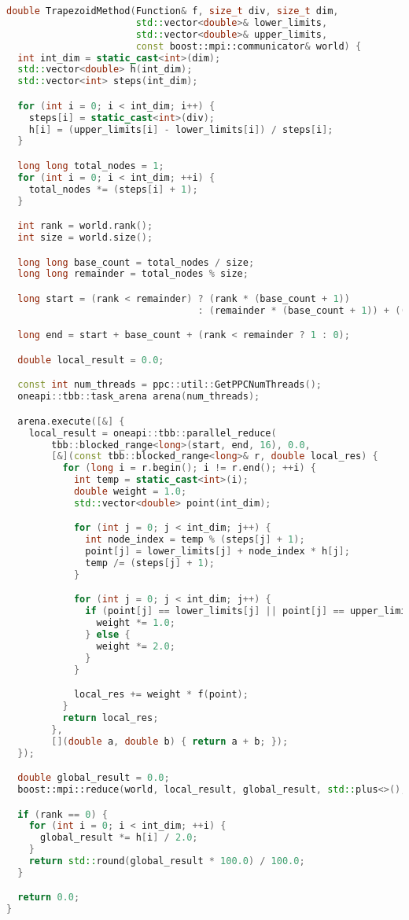 \documentclass[a4paper,14pt]{article}
\begin{document}
\begin{lstlisting}[language=C++]
double TrapezoidMethod(Function& f, size_t div, size_t dim,
                       std::vector<double>& lower_limits,
                       std::vector<double>& upper_limits,
                       const boost::mpi::communicator& world) {
  int int_dim = static_cast<int>(dim);
  std::vector<double> h(int_dim);
  std::vector<int> steps(int_dim);

  for (int i = 0; i < int_dim; i++) {
    steps[i] = static_cast<int>(div);
    h[i] = (upper_limits[i] - lower_limits[i]) / steps[i];
  }

  long long total_nodes = 1;
  for (int i = 0; i < int_dim; ++i) {
    total_nodes *= (steps[i] + 1);
  }

  int rank = world.rank();
  int size = world.size();

  long long base_count = total_nodes / size;
  long long remainder = total_nodes % size;

  long start = (rank < remainder) ? (rank * (base_count + 1))
                                  : (remainder * (base_count + 1)) + ((rank - remainder) * base_count);

  long end = start + base_count + (rank < remainder ? 1 : 0);

  double local_result = 0.0;

  const int num_threads = ppc::util::GetPPCNumThreads();
  oneapi::tbb::task_arena arena(num_threads);

  arena.execute([&] {
    local_result = oneapi::tbb::parallel_reduce(
        tbb::blocked_range<long>(start, end, 16), 0.0,
        [&](const tbb::blocked_range<long>& r, double local_res) {
          for (long i = r.begin(); i != r.end(); ++i) {
            int temp = static_cast<int>(i);
            double weight = 1.0;
            std::vector<double> point(int_dim);

            for (int j = 0; j < int_dim; j++) {
              int node_index = temp % (steps[j] + 1);
              point[j] = lower_limits[j] + node_index * h[j];
              temp /= (steps[j] + 1);
            }

            for (int j = 0; j < int_dim; j++) {
              if (point[j] == lower_limits[j] || point[j] == upper_limits[j]) {
                weight *= 1.0;
              } else {
                weight *= 2.0;
              }
            }

            local_res += weight * f(point);
          }
          return local_res;
        },
        [](double a, double b) { return a + b; });
  });

  double global_result = 0.0;
  boost::mpi::reduce(world, local_result, global_result, std::plus<>(), 0);

  if (rank == 0) {
    for (int i = 0; i < int_dim; ++i) {
      global_result *= h[i] / 2.0;
    }
    return std::round(global_result * 100.0) / 100.0;
  }

  return 0.0;
}
\end{lstlisting}
\end{document}
